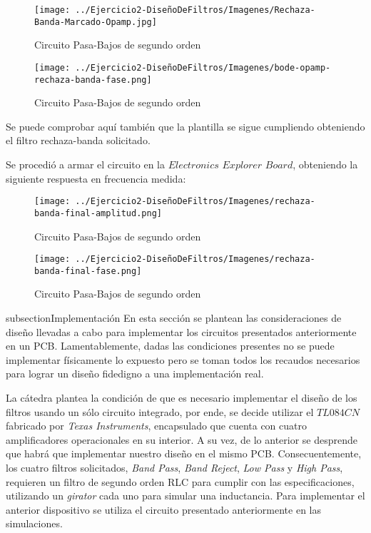 \begin{figure}[H]
    \centering
    \texttt{[image: ../Ejercicio2-DiseñoDeFiltros/Imagenes/Rechaza-Banda-Marcado-Opamp.jpg]}
    \caption{Circuito Pasa-Bajos de segundo orden}
\end{figure}

\begin{figure}[H]
    \centering
    \texttt{[image: ../Ejercicio2-DiseñoDeFiltros/Imagenes/bode-opamp-rechaza-banda-fase.png]}
    \caption{Circuito Pasa-Bajos de segundo orden}
\end{figure}

Se puede comprobar aquí también que la plantilla se sigue cumpliendo obteniendo el filtro rechaza-banda solicitado.

Se procedió a armar el circuito en la $Electronics$ $Explorer$ $Board$, obteniendo la siguiente respuesta en frecuencia medida:

\begin{figure}[H]
    \centering
    \texttt{[image: ../Ejercicio2-DiseñoDeFiltros/Imagenes/rechaza-banda-final-amplitud.png]}
    \caption{Circuito Pasa-Bajos de segundo orden}
\end{figure}

\begin{figure}[H]
    \centering
    \texttt{[image: ../Ejercicio2-DiseñoDeFiltros/Imagenes/rechaza-banda-final-fase.png]}
    \caption{Circuito Pasa-Bajos de segundo orden}
\end{figure}


subsection{Implementación}
En esta sección se plantean las consideraciones de diseño llevadas a cabo para implementar los circuitos presentados anteriormente 
en un PCB. Lamentablemente, dadas las condiciones presentes no se puede implementar físicamente lo expuesto pero se toman todos los 
recaudos necesarios para lograr un diseño fidedigno a una implementación real. \par 

La cátedra plantea la condición de que es necesario implementar el diseño de los filtros usando un sólo circuito integrado, por ende, se 
decide utilizar el $TL084CN$ fabricado por \textit{Texas Instruments},
 encapsulado que cuenta con cuatro amplificadores operacionales en su interior. A su vez, de lo anterior se desprende que habrá que implementar 
 nuestro diseño en el mismo PCB.
Consecuentemente, los cuatro filtros solicitados, \textit{Band Pass}, \textit{Band Reject}, \textit{Low Pass} y \textit{High Pass}, requieren un 
filtro de segundo orden RLC para cumplir con las especificaciones, utilizando un \textit{girator} cada uno para simular una inductancia. Para 
implementar el anterior dispositivo se utiliza el circuito presentado anteriormente en las simulaciones. \par 

